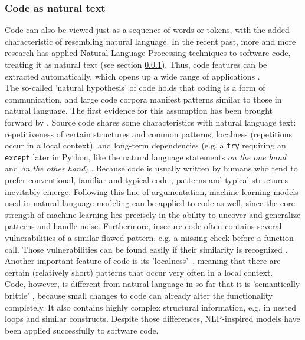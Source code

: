 \documentclass[
a4paper,
pagesize,
pdftex,
12pt,
twoside, %
BCOR=5mm, %
ngerman,
fleqn,
final,
]{scrartcl}
\begin{document}
	\subsubsection{Code as natural text}\label{Natural-Hypothesis}\label{Semantically-Brittle}
	Code can also be viewed just as a sequence of words or tokens, with the added characteristic of resembling natural language. In the recent past, more and more research has applied Natural Language Processing techniques to software code, treating it as natural text (see section \ref{Natural-Hypothesis}). Thus, code features can be extracted automatically, which opens up a wide range of applications \cite{Dam.2017}.\\
	The so-called 'natural hypothesis' of code holds that coding is a form of communication, and large code corpora manifest patterns similar to those in natural language. The first evidence for this assumption has been brought forward by \cite{Hindle.2012}.
	Source code shares some characteristics with natural language text: repetitiveness of certain structures and common patterns, localness (repetitions occur in a local context), and long-term dependencies (e.g. a \texttt{try} requiring an \texttt{except} later in Python, like the natural language statements \textit{on the one hand} and \textit{on the other hand}) \cite{Dam.2016}.
	Because code is usually written by humans who tend to prefer conventional, familiar and typical code \cite{Allamanis.2018}, patterns and typical structures inevitably emerge. Following this line of argumentation, machine learning models used in natural language modeling can be applied to code as well, since the core strength of machine learning lies precisely in the ability to uncover and generalize patterns and handle noise. Furthermore, insecure code often contains several vulnerabilities of a similar flawed pattern, e.g. a missing check before a function call. Those vulnerabilities can be found easily if their similarity is recognized \cite{Yamaguchi.2012}. 
	Another important feature of code is its 'localness'~\cite{Tu.2014}, meaning that there are certain (relatively short) patterns that occur very often in a local context.\\ 
	Code, however, is different from natural language in so far that it is 'semantically brittle' \cite{Allamanis.2018}, because small changes to code can already alter the functionality completely. It also contains highly complex structural information, e.g. in nested loops and similar constructs. Despite those differences, NLP-inspired models have been applied successfully to software code.
	
\end{document}
